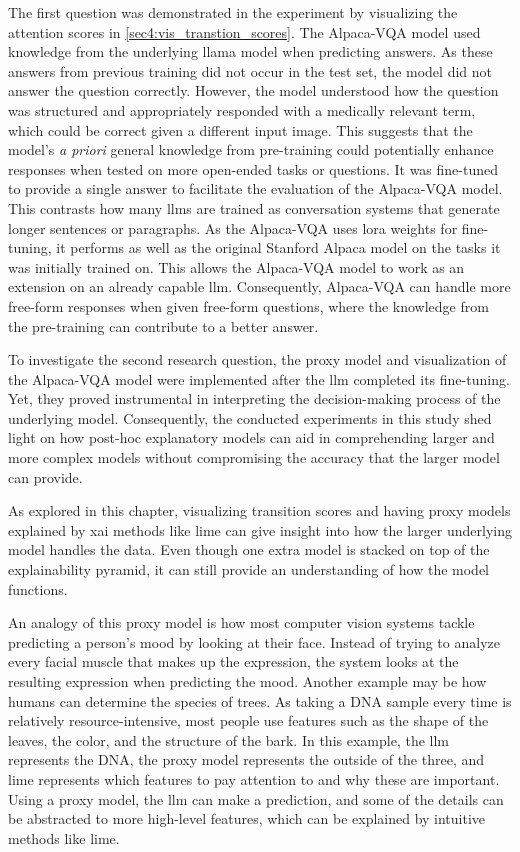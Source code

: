 The first question was demonstrated in the experiment by visualizing the attention scores in  \autoref{sec4:vis_transtion_scores}.
The Alpaca-VQA model used knowledge from the underlying \gls{llama} model when predicting answers. As these answers from previous training did not occur in the test set, the model did not answer the question correctly. However, the model understood how the question was structured and appropriately responded with a medically relevant term, which could be correct given a different input image.
This suggests that the model's \textit{a priori} general knowledge from pre-training could potentially enhance responses when tested on more open-ended tasks or questions. It was fine-tuned to provide a single answer to facilitate the evaluation of the Alpaca-VQA model. This contrasts how many \glspl{llm} are trained as conversation systems that generate longer sentences or paragraphs. As the Alpaca-VQA uses \gls{lora} weights for fine-tuning, it performs as well as the original Stanford Alpaca model on the tasks it was initially trained on. This allows the Alpaca-VQA model to work as an extension on an already capable \gls{llm}. Consequently, Alpaca-VQA can handle more free-form responses when given free-form questions, where the knowledge from the pre-training can contribute to a better answer.

To investigate the second research question, the proxy model and visualization of the Alpaca-VQA model were implemented after the \gls{llm} completed its fine-tuning. Yet, they proved instrumental in interpreting the decision-making process of the underlying model. 
Consequently, the conducted experiments in this study shed light on how post-hoc explanatory models can aid in comprehending larger and more complex models without compromising the accuracy that the larger model can provide.


As explored in this chapter, visualizing transition scores and having proxy models explained by \gls{xai} methods like \gls{lime} can give insight into how the larger underlying model handles the data. Even though one extra model is stacked on top of the explainability pyramid, it can still provide an understanding of how the model functions. 

An analogy of this proxy model is how most computer vision systems tackle predicting a person's mood by looking at their face. Instead of trying to analyze every facial muscle that makes up the expression, the system looks at the resulting expression when predicting the mood. 
Another example may be how humans can determine the species of trees. As taking a DNA sample every time is relatively resource-intensive, most people use features such as the shape of the leaves, the color, and the structure of the bark. In this example, the \gls{llm} represents the DNA, the proxy model represents the outside of the three, and \gls{lime} represents which features to pay attention to and why these are important. 
Using a proxy model, the \gls{llm} can make a prediction, and some of the details can be abstracted to more high-level features, which can be explained by intuitive methods like \gls{lime}.

